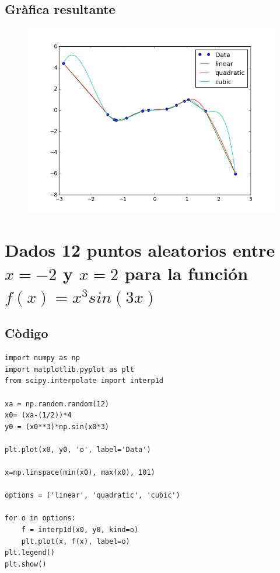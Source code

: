 \documentclass[12pt]{article}
\begin{document}
\subsection{Gràfica resultante}
\begin{figure}[H]
\centering
\includegraphics[scale=.8]{f3}
\end{figure}


\section{Dados 12 puntos aleatorios entre $x=-2$ y $x=2$ para la función $f(x) = x^3 sin(3 x)$}

\subsection{Còdigo}
\begin{verbatim}
import numpy as np
import matplotlib.pyplot as plt
from scipy.interpolate import interp1d

xa = np.random.random(12)
x0= (xa-(1/2))*4
y0 = (x0**3)*np.sin(x0*3)

plt.plot(x0, y0, 'o', label='Data')

x=np.linspace(min(x0), max(x0), 101)

options = ('linear', 'quadratic', 'cubic')

for o in options:
    f = interp1d(x0, y0, kind=o)    
    plt.plot(x, f(x), label=o)     
plt.legend()
plt.show()
\end{verbatim}
\end{document}
